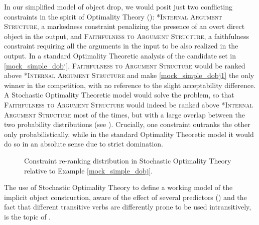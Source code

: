In our simplified model of object drop, we would posit just two conflicting constraints in the spirit of Optimality Theory (): \textsc{*Internal Argument Structure}, a markedness constraint penalizing the presence of an overt direct object in the output, and \textsc{Faithfulness to Argument Structure}, a faithfulness constraint requiring all the arguments in the input to be also realized in the output. In a standard Optimality Theoretic analysis of the candidate set in \ref{mock_simple_dobj}, \textsc{Faithfulness to Argument Structure} would be ranked above \textsc{*Internal Argument Structure} and make \ref{mock_simple_dobj1} the only winner in the competition, with no reference to the slight acceptability difference. A Stochastic Optimality Theoretic model would solve the problem, so that \textsc{Faithfulness to Argument Structure} would indeed be ranked above \textsc{*Internal Argument Structure} most of the times, but with a large overlap between the two probability distributions (see ). Crucially, one constraint outranks the other only probabilistically, while in the standard Optimality Theoretic model it would do so in an absolute sense due to strict domination.

\begin{figure}[htb]
\caption{Constraint re-ranking distribution in Stochastic Optimality Theory relative to Example \ref{mock_simple_dobj}.}
\end{figure}

The use of Stochastic Optimality Theory to define a working model of the implicit object construction, aware of the effect of several predictors () and the fact that different transitive verbs are differently prone to be used intransitively, is the topic of .